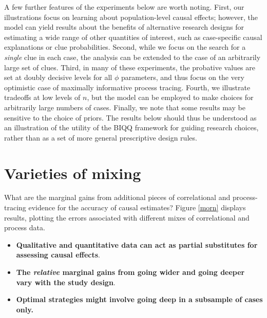 \documentclass[
  12pt,
]{book}
\providecommand{\tightlist}{%
  \setlength{\itemsep}{0pt}\setlength{\parskip}{0pt}}
\begin{document}
A few further features of the experiments below are worth noting. First, our illustrations focus on learning about population-level causal effects; however, the model can yield results about the benefits of alternative research designs for estimating a wide range of other quantities of interest, such as case-specific causal explanations or clue probabilities. Second, while we focus on the search for a \emph{single} clue in each case, the analysis can be extended to the case of an arbitrarily large set of clues. Third, in many of these experiments, the probative values are set at doubly decisive levels for all \(\phi\) parameters, and thus focus on the very optimistic case of maximally informative process tracing. Fourth, we illustrate tradeoffs at low levels of \(n\), but the model can be employed to make choices for arbitrarily large numbers of cases. Finally, we note that some results may be sensitive to the choice of priors. The results below should thus be understood as an illustration of the utility of the BIQQ framework for guiding research choices, rather than as a set of more general prescriptive design rules.

\hypertarget{varieties}{%
\section{Varieties of mixing}\label{varieties}}

What are the marginal gains from additional pieces of correlational and process-tracing evidence for the accuracy of causal estimates? Figure \ref{morn} displays results, plotting the errors associated with different mixes of correlational and process data.

\begin{itemize}
\tightlist
\item
  \textbf{Qualitative and quantitative data can act as partial substitutes for assessing causal effects}.
\item
  \textbf{The \emph{relative} marginal gains from going wider and going deeper vary with the study design}.
\item
  \textbf{Optimal strategies might involve going deep in a subsample of cases only.}
\end{itemize}
\end{document}
